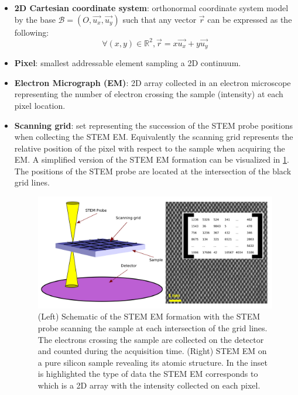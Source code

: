 \documentclass[12pt]{article}
\begin{document}
\begin{itemize}

\item \textbf{2D Cartesian coordinate system}: orthonormal coordinate system model by the base $\mathcal{B}=(O,\vec{u_x},\vec{u_y})$ such that any vector $\vec{r}$ can be expressed as the following:
\begin{equation}
\forall (x,y) \in \mathbb{R}^{2}, \vec{r}=x\vec{u_x}+y\vec{u_y}
\end{equation}
\item \textbf{Pixel}: smallest addressable element sampling a 2D continuum.
\item \textbf{Electron Micrograph (EM)}: 2D array collected in an electron microscope representing the number of electron crossing the sample (intensity) at each pixel location.
\item \textbf{Scanning grid}: set representing the succession of the STEM probe positions when collecting the STEM EM. Equivalently the scanning grid represents the relative position of the pixel with respect to the sample when acquiring the EM. A simplified version of the 
STEM EM formation can be visualized in \cref{fig:STEM_imaging_Fig}. The positions of the STEM probe are located at the intersection of the black grid lines.
\begin{figure}[H]
\begin{center}
\includegraphics[scale=0.7]{Figures/STEM_imaging_Fig.png}
\caption{(Left) Schematic of the STEM EM formation with the STEM probe scanning the sample at each intersection of the grid lines. The electrons crossing the sample are collected on the detector and counted during the acquisition time. (Right) STEM EM on a pure silicon sample revealing its atomic structure. In the inset is highlighted the type of data the STEM EM corresponds to which is a 2D array with the intensity collected on each pixel.}
\label{fig:STEM_imaging_Fig}
\end{center}

\end{figure}
\end{itemize}
\end{document}
